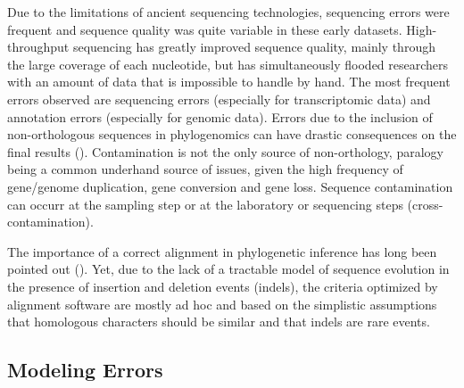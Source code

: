 Due to the limitations of ancient sequencing technologies, sequencing errors were frequent and sequence quality was quite variable in these early datasets. High-throughput  sequencing  has  greatly  improved  sequence  quality,  mainly  through  the  large  coverage  of each nucleotide, but has simultaneously flooded researchers with an amount of data that is  impossible to  handle  by  hand. The most frequent errors observed are sequencing errors (especially for transcriptomic data) and annotation errors (especially for genomic data).  Errors due to the inclusion of non-orthologous sequences in phylogenomics can have drastic consequences on the final results (\cite{laurin2012origin,philippe2011resolving}).  Contamination is not the only source of non-orthology, paralogy being a common underhand source of issues, given the high frequency of gene/genome duplication, gene conversion and gene loss. Sequence contamination can occurr at the sampling step or at the laboratory or sequencing steps (cross-contamination).

The importance of a correct alignment in phylogenetic inference has long been pointed out (\cite{morrison1997effects,ogden2006multiple,talavera2007improvement,wong2008alignment}). Yet, due to the lack of a tractable model of sequence evolution in the presence of insertion and deletion events (indels), the criteria optimized by alignment software are mostly ad hoc  and based on the simplistic assumptions that homologous characters should be similar and that indels are rare events.


\subsection{Modeling Errors} \label{sec:modeling-errors}
%

